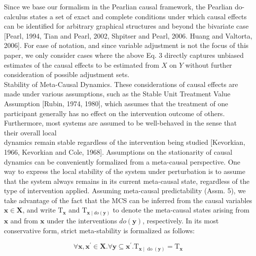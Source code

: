 \documentclass[10pt]{article}
\begin{document}
Since we base our formalism in the Pearlian causal framework, the Pearlian do-calculus states a set of exact and complete conditions under which causal effects can be identified for arbitrary graphical structures and beyond the bivariate case [Pearl, 1994, Tian and Pearl, 2002, Shpitser and Pearl, 2006. Huang and Valtorta, 2006]. For ease of notation, and since variable adjustment is not the focus of this paper, we only consider cases where the above Eq. 3 directly captures unbiased estimates of the causal effects to be estimated from $X$ on $Y$ without further consideration of possible adjustment sets.\\[0pt]
Stability of Meta-Causal Dynamics. These considerations of causal effects are made under various assumptions, such as the Stable Unit Treatment Value Assumption [Rubin, 1974, 1980], which assumes that the treatment of one participant generally has no effect on the intervention outcome of others. Furthermore, most systems are assumed to be well-behaved in the sense that their overall local\\[0pt]
dynamics remain stable regardless of the intervention being studied [Kevorkian, 1966, Kevorkian and Cole, 1968]. Assumptions on the stationarity of causal dynamics can be conveniently formalized from a meta-causal perspective. One way to express the local stability of the system under perturbation is to assume that the system always remains in its current meta-causal state, regardless of the type of intervention applied. Assuming meta-causal predictability (Assm. 5), we take advantage of the fact that the MCS can be inferred from the causal variables $\mathbf{x} \in \mathbf{X}$, and write $\mathrm{T}_{\mathbf{x}}$ and $\mathrm{T}_{\mathbf{x} \mid d o(\mathbf{y})}$ to denote the meta-causal states arising from $\mathbf{x}$ and from $\mathbf{x}$ under the interventions $d o(\mathbf{y})$, respectively. In its most conservative form, strict meta-stability is formalized as follows:


\begin{equation*}
\forall \mathbf{x}, \mathbf{x}^{\prime} \in \mathbf{X} . \forall \mathbf{y} \subseteq \mathbf{x}^{\prime} . \mathrm{T}_{\mathbf{x} \mid \operatorname{do}(\mathbf{y})}=\mathrm{T}_{\mathbf{x}} \tag{4}
\end{equation*}
\end{document}
